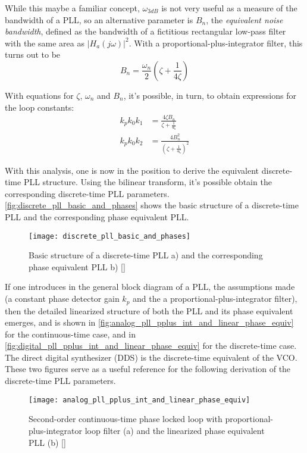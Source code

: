While this maybe a familiar concept, $\omega_{3dB}$ is not very useful as a measure of the bandwidth of a PLL, so an alternative parameter is $B_n$, the \emph{equivalent noise bandwidth}, defined as the bandwidth of a fictitious rectangular low-pass filter with the same area as $|H_a(j\omega)|^2$. With a proportional-plus-integrator filter, this turns out to be
\begin{equation}B_n=\frac{\omega_n}{2}\left(\zeta+\frac{1}{4\zeta}\right)\end{equation}

With equations for $\zeta$, $\omega_n$ and $B_n$, it's possible, in turn, to obtain expressions for the loop constants:
\begin{align}
k_p k_0 k_1 &= \frac{4\zeta B_n}{\zeta+\frac{1}{4\zeta}}\\
k_p k_0 k_2 &= \frac{4 B_n^2}{\left(\zeta+\frac{1}{4\zeta}\right)^2}
\end{align}

With this analysis, one is now in the position to derive the equivalent discrete-time PLL structure. Using the bilinear transform, it's possible obtain the corresponding discrete-time PLL parameters. \autoref{fig:discrete_pll_basic_and_phases} shows the basic structure of a discrete-time PLL and the corresponding phase equivalent PLL.

\begin{figure}[ht]
  \centering
  \texttt{[image: discrete\_pll\_basic\_and\_phases]}
  \caption{Basic structure of a discrete-time PLL a) and the corresponding phase equivalent PLL b) [\citeauthor{digcomm_discrete_approach}]}
  \label{fig:discrete_pll_basic_and_phases}
\end{figure}

If one introduces in the general block diagram of a PLL, the assumptions made (a constant phase detector gain $k_p$ and the a proportional-plus-integrator filter), then the detailed linearized structure of both the PLL and its phase equivalent emerges, and is shown in \autoref{fig:analog_pll_pplus_int_and_linear_phase_equiv} for the continuous-time case, and in \autoref{fig:digital_pll_pplus_int_and_linear_phase_equiv} for the discrete-time case. The direct digital synthesizer (DDS) is the discrete-time equivalent of the VCO. These two figures serve as a useful reference for the following derivation of the discrete-time PLL parameters.

\begin{figure}[H]
  \centering
  \texttt{[image: analog\_pll\_pplus\_int\_and\_linear\_phase\_equiv]}
  \caption{Second-order continuous-time phase locked loop with proportional-plus-integrator loop filter (a) and the linearized phase equivalent PLL (b) [\citeauthor{digcomm_discrete_approach}]}
  \label{fig:analog_pll_pplus_int_and_linear_phase_equiv}
\end{figure}


